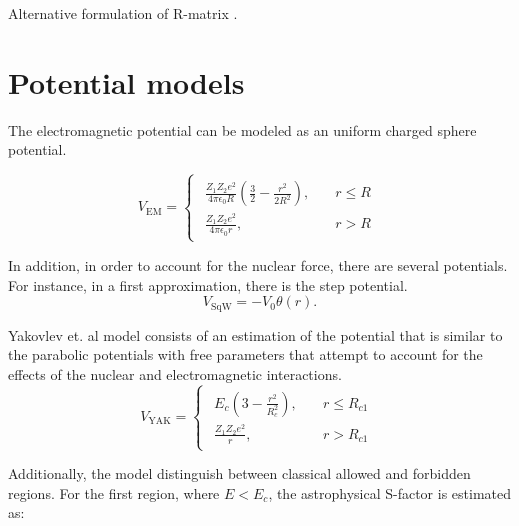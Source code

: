 \documentclass[openany]{book}
\begin{document}
Alternative formulation of R-matrix \cite{brune_2002}.


\section{Potential models} \label{sec:potentialModels}

The electromagnetic potential can be modeled as an uniform charged sphere potential. 

\begin{equation} \label{eq:potential_EM}
	V_{\mathrm{EM}} = 	\left\{\begin{array}{l}
		\begin{split}
			\frac{Z_1Z_2e^2}{4\pi\epsilon_0R}\left(\frac{3}{2} - \frac{r^2}{2R^2}\right), \quad &r \le R \\ 
			\frac{Z_1Z_2e^2}{4\pi\epsilon_0r}, \quad &r > R	
		\end{split}
	\end{array}\right.
\end{equation}

In addition, in order to account for the nuclear force, there are several potentials. For instance, in a first approximation, there is the step potential.
\begin{equation} \label{eq:potential_squareWell}
	V_{\mathrm{SqW}} = -V_0\theta(r).
\end{equation}

Yakovlev et. al model \cite{yakovlev_beard_gasques_wiescher_2010} consists of an estimation of the potential that is similar to the parabolic potentials with free parameters that attempt to account for the effects of the nuclear and electromagnetic interactions.  \\


\begin{equation} \label{eq:potential_Yakovlev}
	V_{\mathrm{YAK}} = 	\left\{\begin{array}{l}
		\begin{split}
			E_c\left(3 - \frac{r^2}{R_c^2}\right), \quad &r \le R_{c1} \\ 
			\frac{Z_1Z_2e^2}{r}, \quad &r > R_{c1}	
		\end{split}
	\end{array}\right.
\end{equation}

Additionally, the model distinguish between classical allowed and forbidden regions.  For the first region, where $E < E_c$, the astrophysical S-factor is estimated as:
\end{document}

